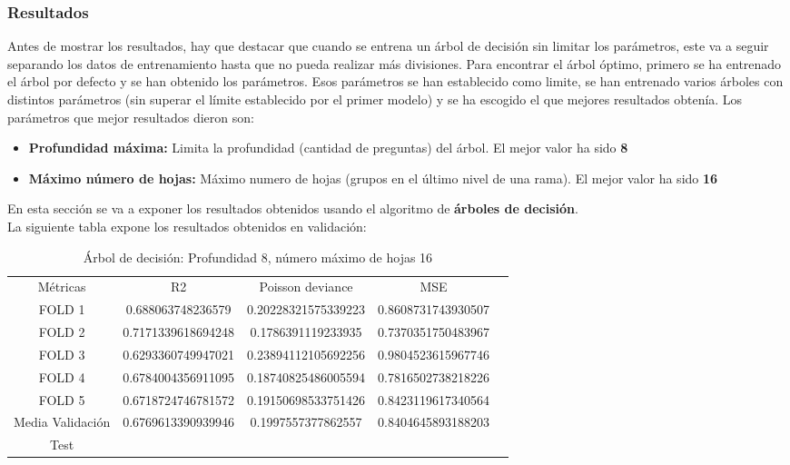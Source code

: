 \subsubsection{Resultados}
Antes de mostrar los resultados, hay que destacar que cuando se entrena un árbol de decisión sin limitar los parámetros, este va a seguir separando los datos de entrenamiento hasta que no pueda realizar más divisiones. Para encontrar el árbol óptimo, primero se ha entrenado el árbol por defecto y se han obtenido los parámetros. Esos parámetros se han establecido como limite, se han entrenado varios árboles con distintos parámetros (sin superar el límite establecido por el primer modelo) y se ha escogido el que mejores resultados obtenía. Los parámetros que mejor resultados dieron son: \\
\begin{itemize}
	\item \textbf{Profundidad máxima:} Limita la profundidad (cantidad de preguntas) del árbol. El mejor valor ha sido \textbf{8}
	\item \textbf{Máximo número de hojas:} Máximo numero de hojas (grupos en el último nivel de una rama). El mejor valor ha sido \textbf{16}
\end{itemize}
En esta sección se va a exponer los resultados obtenidos usando el algoritmo de \textbf{árboles de decisión}.\\
La siguiente tabla expone los resultados obtenidos en validación:
\begin{table}[htbp]
    \begin{tabular}{|c|c|c|c|c}
    \cline{1-4}
    Métricas & R2                 & Poisson deviance    & MSE                  \\ \cline{1-4}
    FOLD 1   & 0.688063748236579  & 0.20228321575339223 & 0.8608731743930507   \\ \cline{1-4}
    FOLD 2   & 0.7171339618694248 & 0.1786391119233935  & 0.7370351750483967   \\ \cline{1-4}
    FOLD 3   & 0.6293360749947021 & 0.23894112105692256 & 0.9804523615967746   \\ \cline{1-4}
    FOLD 4   & 0.6784004356911095 & 0.18740825486005594 & 0.7816502738218226   \\ \cline{1-4}
    FOLD 5   & 0.6718724746781572 & 0.19150698533751426 & 0.8423119617340564   \\ \cline{1-4}
    Media Validación    & 0.6769613390939946 & 0.1997557377862557  & 0.8404645893188203   \\  \cline{1-4}
    Test & & & \\ \cline{1-4}
    \end{tabular}
	\caption{Árbol de decisión:  Profundidad 8, número máximo de hojas 16}
	\label{tab:tree_res}
\end{table}

